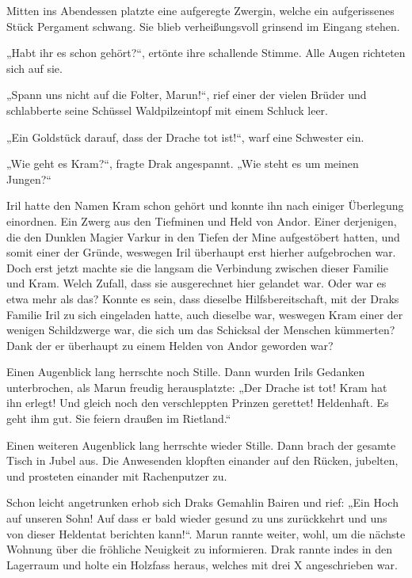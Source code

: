 \trennzeichen



Mitten ins Abendessen platzte eine aufgeregte Zwergin, welche ein aufgerissenes Stück Pergament schwang. Sie blieb verheißungsvoll grinsend im Eingang stehen.

„Habt ihr es schon gehört?“, ertönte ihre schallende Stimme. Alle Augen richteten sich auf sie.

„Spann uns nicht auf die Folter, Marun!“, rief einer der vielen Brüder und schlabberte seine Schüssel Waldpilzeintopf mit einem Schluck leer.

„Ein Goldstück darauf, dass der Drache tot ist!“, warf eine Schwester ein.

„Wie geht es Kram?“, fragte Drak angespannt. „Wie steht es um meinen Jungen?“

Iril hatte den Namen Kram schon gehört und konnte ihn nach einiger Überlegung einordnen. Ein Zwerg aus den Tiefminen und Held von Andor. Einer derjenigen, die den Dunklen Magier Varkur in den Tiefen der Mine aufgestöbert hatten, und somit einer der Gründe, weswegen Iril überhaupt erst hierher aufgebrochen war. Doch erst jetzt machte sie die langsam die Verbindung zwischen dieser Familie und Kram. Welch Zufall, dass sie ausgerechnet hier gelandet war. Oder war es etwa mehr als das? Konnte es sein, dass dieselbe Hilfsbereitschaft, mit der Draks Familie Iril zu sich eingeladen hatte, auch dieselbe war, weswegen Kram einer der wenigen Schildzwerge war, die sich um das Schicksal der Menschen kümmerten? Dank der er überhaupt zu einem Helden von Andor geworden war?

Einen Augenblick lang herrschte noch Stille. Dann wurden Irils Gedanken unterbrochen, als Marun freudig herausplatzte: „Der Drache ist tot! Kram hat ihn erlegt! Und gleich noch den verschleppten Prinzen gerettet! Heldenhaft. Es geht ihm gut. Sie feiern draußen im Rietland.“

Einen weiteren Augenblick lang herrschte wieder Stille. Dann brach der gesamte Tisch in Jubel aus. Die Anwesenden klopften einander auf den Rücken, jubelten, und prosteten einander mit Rachenputzer zu.

Schon leicht angetrunken erhob sich Draks Gemahlin Bairen und rief: „Ein Hoch auf unseren Sohn! Auf dass er bald wieder gesund zu uns zurückkehrt und uns von dieser Heldentat berichten kann!“. Marun rannte weiter, wohl, um die nächste Wohnung über die fröhliche Neuigkeit zu informieren. Drak rannte indes in den Lagerraum und holte ein Holzfass heraus, welches mit drei X angeschrieben war.


